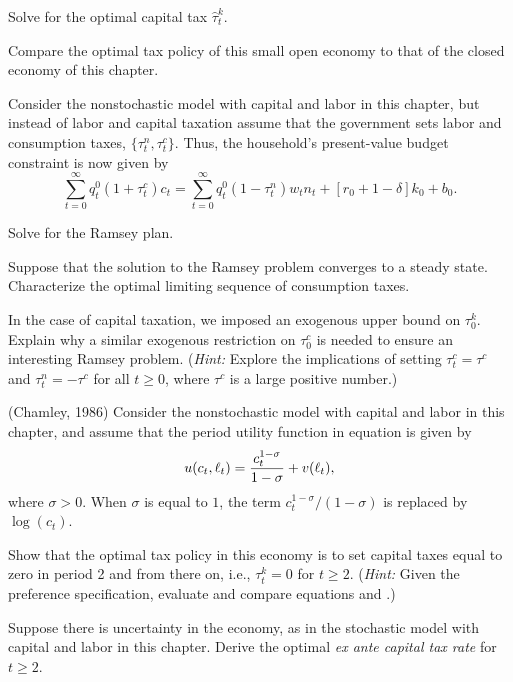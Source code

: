 \medskip
{} Solve for the optimal capital tax $\hat \tau^k_t$.

\medskip
{} Compare the optimal tax policy of this small open
economy to that of the closed economy of this chapter.


\medskip
{} 
\medskip
\noindent
Consider the nonstochastic model with capital and labor in this
chapter, but instead of labor and capital taxation assume that the
government sets labor and consumption taxes, $\{\tau^n_t, \tau^c_t\}$.
Thus, the household's present-value budget constraint is now given by
$$
\sum_{t=0}^\infty q^0_t (1+\tau^c_t) c_t =
\sum_{t=0}^\infty q^0_t (1-\tau^n_t) w_t n_t
   + \left[r_{0} + 1-\delta \right] k_0 + b_0.
$$

\medskip
{} Solve for the Ramsey plan.

\medskip
{} Suppose that the solution to the Ramsey problem converges
to a steady state.
Characterize the optimal limiting sequence of consumption taxes.

\medskip
{} In the case of capital taxation, we imposed an
exogenous upper bound on $\tau^k_0$. Explain why a similar exogenous
restriction on $\tau^c_0$ is needed to ensure an interesting
Ramsey problem. ({\it Hint:} Explore the implications of setting
$\tau^c_t=\tau^c$ and $\tau^n_t=-\tau^c$ for all $t\geq 0$,
where $\tau^c$ is a large positive number.)


\medskip
{}  (Chamley, 1986)
\medskip
\noindent
Consider the nonstochastic model with capital and labor in this
chapter, and assume that the period utility function in equation 
is given by
$$
u(c_t,\ell_t) = {c_t^{1-\sigma} \over 1-\sigma} + v(\ell_t),
$$
where $\sigma>0$. When $\sigma$ is equal to $1$, the term
$c_t^{1-\sigma} / (1-\sigma)$ is replaced by $\log (c_t)$.

\medskip
{} Show that the optimal tax policy in this economy is to set
capital taxes equal to zero in period 2 and from there on, i.e.,
$\tau^k_t=0$ for $t\geq 2$. ({\it Hint:} Given the preference specification,
evaluate and compare equations  and .)

\medskip
{} Suppose there is uncertainty in the economy, as
in the stochastic model with capital and labor in this chapter.
Derive the optimal {\it ex ante capital tax rate\/} for $t\geq 2$.

